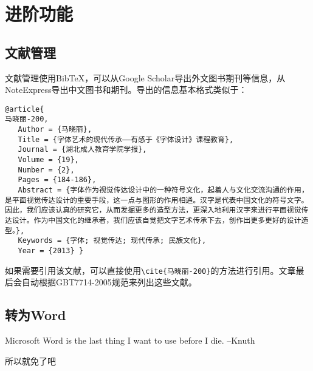 \section{进阶功能}
\subsection{文献管理}
文献管理使用Bib\TeX ，可以从Google Scholar导出外文图书期刊等信息，从NoteExpress导出中文图书和期刊。导出的信息基本格式类似于：
\begin{verbatim}
@article{
马晓丽-200,
   Author = {马晓丽},
   Title = {字体艺术的现代传承——有感于《字体设计》课程教育},
   Journal = {湖北成人教育学院学报},
   Volume = {19},
   Number = {2},
   Pages = {184-186},
   Abstract = {字体作为视觉传达设计中的一种符号文化，起着人与文化交流沟通的作用，是平面视觉传达设计的重要手段，这一点与图形的作用相通。汉字是代表中国文化的符号文字。因此，我们应该认真的研究它，从而发掘更多的造型方法，更深入地利用汉字来进行平面视觉传达设计。作为中国文化的继承者，我们应该自觉把文字艺术传承下去，创作出更多更好的设计造型。},
   Keywords = {字体; 视觉传达; 现代传承; 民族文化},
   Year = {2013} }
\end{verbatim}
如果需要引用该文献，可以直接使用\verb|\cite{马晓丽-200}|的方法进行引用。文章最后会自动根据GBT7714-2005规范来列出这些文献。
\subsection{转为Word}
Microsoft Word is the last thing I want to use before I die.
--Knuth

所以就免了吧